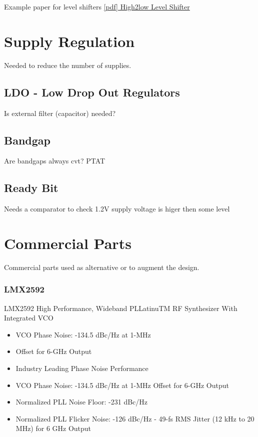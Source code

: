 \documentclass{article}
\begin{document}
Example paper for level shifters 
\href{http://leda.elfak.ni.ac.rs/publications/pdf/Conferences/2015/Etran/Low-power%20And%20High%20Speed%20High-to-Low%20level%20Shifter.pdf}{[pdf] High2low Level Shifter}

\section{Supply Regulation}

Needed to reduce the number of supplies.

\subsection{LDO - Low Drop Out Regulators}

Is external filter (capacitor) needed?

\subsection{Bandgap}

Are bandgaps always cvt?
PTAT 


\subsection{Ready Bit}

Needs a comparator to check 1.2\unit{V} supply voltage is higer then some level 



\section{Commercial Parts}

Commercial parts used as alternative or to augment the design.

\subsubsection*{LMX2592}
LMX2592 High Performance, Wideband PLLatinuTM RF Synthesizer With Integrated VCO

\begin{itemize}

	\item VCO Phase Noise: -134.5 dBc/Hz at 1-\unit{\MHz}
	\item Offset for 6-\unit{\GHz} Output
	\item Industry Leading Phase Noise Performance 
	\item VCO Phase Noise: -134.5 dBc/\unit{\Hz} at 1-\unit{\MHz} Offset for 6-GHz Output
	\item Normalized PLL Noise Floor: -231 dBc/Hz 
	\item Normalized PLL Flicker Noise: -126 dBc/Hz - 49-\unit{\fs} RMS Jitter (12 \unit{\kHz} to 20 \unit{\MHz}) for 6 \unit{\GHz} Output

\end{itemize}
\end{document}
